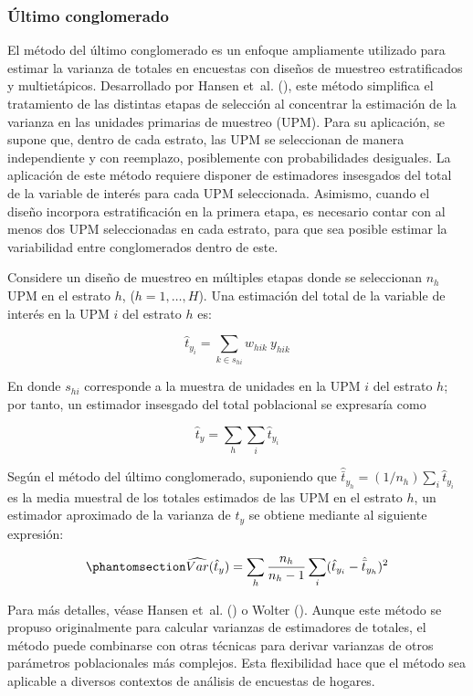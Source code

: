 \documentclass[
  spanish,
  11pt,
  letterpaper,
  oneside,
  open=any]{scrbook}
\begin{document}
\subsubsection{Último conglomerado}\label{ultimo-conglomerado}

El método del último conglomerado es un enfoque ampliamente utilizado
para estimar la varianza de totales en encuestas con diseños de muestreo
estratificados y multietápicos. Desarrollado por {Hansen et~al.}
(), este método simplifica el
tratamiento de las distintas etapas de selección al concentrar la
estimación de la varianza en las unidades primarias de muestreo (UPM).
Para su aplicación, se supone que, dentro de cada estrato, las UPM se
seleccionan de manera independiente y con reemplazo, posiblemente con
probabilidades desiguales. La aplicación de este método requiere
disponer de estimadores insesgados del total de la variable de interés
para cada UPM seleccionada. Asimismo, cuando el diseño incorpora
estratificación en la primera etapa, es necesario contar con al menos
dos UPM seleccionadas en cada estrato, para que sea posible estimar la
variabilidad entre conglomerados dentro de este.

Considere un diseño de muestreo en múltiples etapas donde se seleccionan
\(n_h\) UPM en el estrato \(h\), (\(h=1,\dots,H\)). Una estimación del
total de la variable de interés en la UPM \(i\) del estrato \(h\) es:

\[\hat{t}_{y_i} = \sum_{k\in s_{hi}} w_{hik} \ y_{hik}\]

En donde \(s_{hi}\) corresponde a la muestra de unidades en la UPM \(i\)
del estrato \(h\); por tanto, un estimador insesgado del total
poblacional se expresaría como

\[\hat{t}_{y}  = \sum_{h}\sum_{i} \hat{t}_{y_i}\]

Según el método del último conglomerado, suponiendo que
\(\hat{\bar t}_{y_h}=(1/{n_h}) \sum_{i} \hat{t}_{y_i}\) es la media
muestral de los totales estimados de las UPM en el estrato \(h\), un
estimador aproximado de la varianza de \(\hat t_y\) se obtiene mediante
al siguiente expresión:

\begin{equation}\protect\phantomsection\label{eq-varianza-ultimo-conglomerado}{\widehat{Var}(\hat{t}_y) = \sum_{h} \frac{n_h}{n_h-1} \sum_{i} (\hat{t}_{y_i} - \hat{\bar t}_{y_h})^2}\end{equation}

Para más detalles, véase {Hansen et~al.}
() o Wolter
(). Aunque este método se propuso
originalmente para calcular varianzas de estimadores de totales, el
método puede combinarse con otras técnicas para derivar varianzas de
otros parámetros poblacionales más complejos. Esta flexibilidad hace que
el método sea aplicable a diversos contextos de análisis de encuestas de
hogares.
\end{document}
